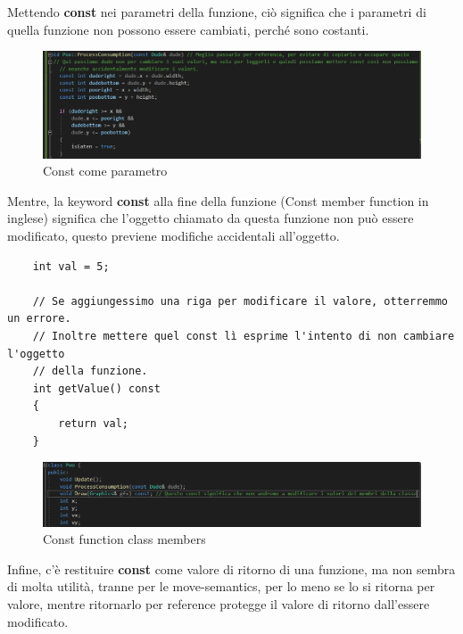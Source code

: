 \textsf{\small Mettendo \textbf{const} nei parametri della funzione, ciò significa che i parametri di quella funzione non possono essere cambiati, perché sono costanti.}



\begin{figure}[H]
	\centering
	\includegraphics[width=1\textwidth, height=1\textheight, keepaspectratio]{./imgs/const_as_parameter.png}
	\caption{Const come parametro}
	\label{fig:const_as_parameter}
\end{figure}

\textsf{\small Mentre, la keyword \textbf{const} alla fine della funzione (Const member function in inglese) significa che l'oggetto chiamato da questa funzione non può essere modificato, questo previene modifiche accidentali all'oggetto. } \\

\begin{lstlisting}
	int val = 5;
	
	// Se aggiungessimo una riga per modificare il valore, otterremmo un errore.
	// Inoltre mettere quel const lì esprime l'intento di non cambiare l'oggetto 
	// della funzione.
	int getValue() const
	{
		return val;
	}
\end{lstlisting}

\begin{figure}[H]
	\centering
	\includegraphics[width=1\textwidth, height=1\textheight, keepaspectratio]{./imgs/const_function_class_members.png}
	\caption{Const function class members}
	\label{fig:const_function_class_members}
\end{figure}

\textsf{\small Infine, c'è restituire \textbf{const} come valore di ritorno di una funzione, ma non sembra di molta utilità, tranne per le move-semantics, per lo meno se lo si ritorna per valore, mentre ritornarlo per reference protegge il valore di ritorno dall'essere modificato.} \\


